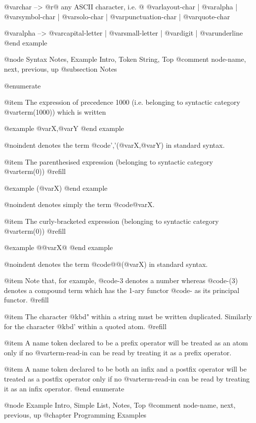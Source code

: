 {{{{{@var{char}              --> @r{@{ any ASCII character, i.e. @}}
                      @var{layout-char}
                   |  @var{alpha}
                   |  @var{symbol-char}
                   |  @var{solo-char}
                   |  @var{punctuation-char}
                   |  @var{quote-char}

@var{alpha}             --> @var{capital-letter} | @var{small-letter} | @var{digit} | @var{underline}
@end example

@node Syntax Notes, Example Intro, Token String, Top
@comment  node-name,  next,  previous,  up
@subsection Notes

@enumerate

@item
The expression of precedence 1000 (i.e. belonging to syntactic category
@var{term(1000)}) which is written

@example
@var{X},@var{Y}
@end example

@noindent
denotes the term @code{','(@var{X},@var{Y})} in standard syntax.

@item
The parenthesised expression (belonging to syntactic category
@var{term(0)}) @refill

@example
(@var{X})
@end example

@noindent
denotes simply the term @code{@var{X}}.

@item
The curly-bracketed expression (belonging to syntactic category
@var{term(0)}) @refill

@example
@{@var{X}@}
@end example

@noindent
denotes the term @code{@{@}(@var{X})} in standard syntax.

@item
Note that, for example, @code{-3} denotes a number whereas @code{-(3)}
denotes a compound term which has the 1-ary functor @code{-} as its principal
functor. @refill

@item
The character @kbd{"} within a string must be written duplicated.
Similarly for the character @kbd{'} within a quoted atom. @refill

@item
A name token declared to be a prefix operator will be treated as an atom
only if no @var{term-read-in} can be read by treating it as a prefix
operator.

@item
A name token declared to be both an infix and a postfix operator will be
treated as a postfix operator only if no @var{term-read-in} can be read
by treating it as an infix operator.
@end enumerate

@node Example Intro, Simple List, Notes, Top
@comment  node-name,  next,  previous,  up
@chapter Programming Examples

}}}}}
